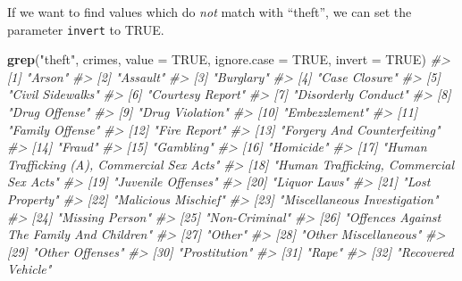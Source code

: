 \documentclass[
  12pt,
]{book}
\newenvironment{Shaded}{\begin{snugshade}}{\end{snugshade}}
\newcommand{\CommentTok}[1]{\textcolor[rgb]{0.37,0.37,0.37}{\textit{#1}}}
\newcommand{\DataTypeTok}[1]{\textcolor[rgb]{0.27,0.27,0.27}{#1}}
\newcommand{\KeywordTok}[1]{\textcolor[rgb]{0.27,0.27,0.27}{\textbf{#1}}}
\newcommand{\NormalTok}[1]{#1}
\newcommand{\OtherTok}[1]{\textcolor[rgb]{0.37,0.37,0.37}{#1}}
\newcommand{\StringTok}[1]{\textcolor[rgb]{0.5,0.5,0.5}{#1}}
\begin{document}
If we want to find values which do \emph{not} match with ``theft'', we can set the parameter \texttt{invert} to TRUE.

\begin{Shaded}
\begin{Highlighting}[]
\KeywordTok{grep}\NormalTok{(}\StringTok{"theft"}\NormalTok{, crimes, }\DataTypeTok{value =} \OtherTok{TRUE}\NormalTok{, }\DataTypeTok{ignore.case =} \OtherTok{TRUE}\NormalTok{, }\DataTypeTok{invert =} \OtherTok{TRUE}\NormalTok{)}
\CommentTok{\#>  [1] "Arson"                                     }
\CommentTok{\#>  [2] "Assault"                                   }
\CommentTok{\#>  [3] "Burglary"                                  }
\CommentTok{\#>  [4] "Case Closure"                              }
\CommentTok{\#>  [5] "Civil Sidewalks"                           }
\CommentTok{\#>  [6] "Courtesy Report"                           }
\CommentTok{\#>  [7] "Disorderly Conduct"                        }
\CommentTok{\#>  [8] "Drug Offense"                              }
\CommentTok{\#>  [9] "Drug Violation"                            }
\CommentTok{\#> [10] "Embezzlement"                              }
\CommentTok{\#> [11] "Family Offense"                            }
\CommentTok{\#> [12] "Fire Report"                               }
\CommentTok{\#> [13] "Forgery And Counterfeiting"                }
\CommentTok{\#> [14] "Fraud"                                     }
\CommentTok{\#> [15] "Gambling"                                  }
\CommentTok{\#> [16] "Homicide"                                  }
\CommentTok{\#> [17] "Human Trafficking (A), Commercial Sex Acts"}
\CommentTok{\#> [18] "Human Trafficking, Commercial Sex Acts"    }
\CommentTok{\#> [19] "Juvenile Offenses"                         }
\CommentTok{\#> [20] "Liquor Laws"                               }
\CommentTok{\#> [21] "Lost Property"                             }
\CommentTok{\#> [22] "Malicious Mischief"                        }
\CommentTok{\#> [23] "Miscellaneous Investigation"               }
\CommentTok{\#> [24] "Missing Person"                            }
\CommentTok{\#> [25] "Non{-}Criminal"                              }
\CommentTok{\#> [26] "Offences Against The Family And Children"  }
\CommentTok{\#> [27] "Other"                                     }
\CommentTok{\#> [28] "Other Miscellaneous"                       }
\CommentTok{\#> [29] "Other Offenses"                            }
\CommentTok{\#> [30] "Prostitution"                              }
\CommentTok{\#> [31] "Rape"                                      }
\CommentTok{\#> [32] "Recovered Vehicle"                         }

\end{Highlighting}
\end{Shaded}
\end{document}
